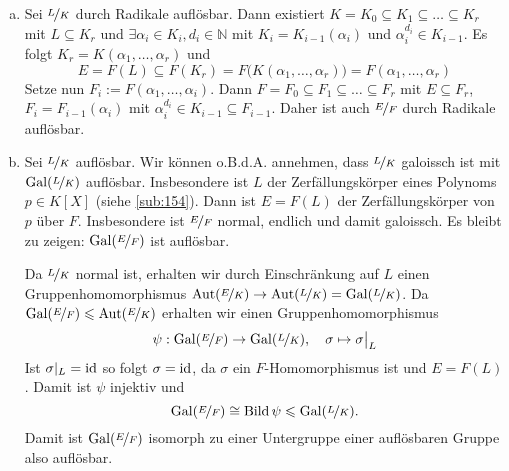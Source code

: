 \begin{enumerate}[a)]
	\item Sei $\nicefrac{L}{K}$ durch Radikale auflösbar. Dann existiert $K= K_0 \subseteq K_1 \subseteq \ldots \subseteq K_r$ mit 
	$L \subseteq K_r$ und $\exists \alpha_i \in K_i, d_i \in \mathds{N}$ mit $K_i= K_{i-1}(\alpha_i)$ und $\alpha_i^{d_i} \in K_{i-1}$.
	Es folgt $K_r = K(\alpha_1, \ldots , \alpha_r)$ und
	\[
		E=F(L) \subseteq F(K_r) = F\big(K(\alpha_1, \ldots , \alpha_r)\big) = F(\alpha_1, \ldots , \alpha_r)
	\]
	Setze nun $F_i := F(\alpha_1, \ldots , \alpha_i)$. Dann $F=F_0 \subseteq F_1 \subseteq \ldots \subseteq F_r$ mit $E \subseteq F_r$, $F_i = F_{i-1}(\alpha_i)$ mit
	$\alpha_i^{d_i} \in K_{i-1} \subseteq F_{i-1}$. Daher ist auch $\nicefrac{E}{F}$ durch Radikale auflösbar.
	\item Sei $\nicefrac{L}{K}$ auflösbar. Wir können o.B.d.A. annehmen, dass $\nicefrac{L}{K}$ galoissch ist mit $\operatorname{Gal}(\nicefrac{L}{K})$ auflösbar. Insbesondere ist 
	$L$ der Zerfällungskörper eines Polynoms $p \in K[X]$ (siehe \ref{sub:154}). Dann ist $E=F(L)$ der Zerfällungskörper von $p$ über $F$. Insbesondere ist 
	$\nicefrac{E}{F}$ normal, endlich und damit galoissch. Es bleibt zu zeigen: $\operatorname{Gal}(\nicefrac{E}{F})$ ist auflösbar.
	
	Da $\nicefrac{L}{K}$ normal ist, erhalten wir durch Einschränkung auf $L$ einen Gruppenhomomorphismus 
	$\operatorname{Aut} (\nicefrac{E}{K}) \to\operatorname{Aut}(\nicefrac{L}{K}) = \operatorname{Gal}(\nicefrac{L}{K})$. Da $\operatorname{Gal}(\nicefrac{E}{F}) \leqslant \operatorname{Aut}(\nicefrac{E}{K})$ erhalten wir einen Gruppenhomomorphismus
	\[
		\psi : \operatorname{Gal}(\nicefrac{E}{F}) \to \operatorname{Gal}(\nicefrac{L}{K}), \quad \sigma \mapsto \sigma\big|_L
	\]
	Ist $\sigma|_L = \operatorname{id}$ so folgt $\sigma= \operatorname{id}$, da $\sigma$ ein $F$-Homomorphismus ist und $E=F(L)$. Damit ist $\psi$ injektiv und 
	\[
		\operatorname{Gal}(\nicefrac{E}{F}) \cong \operatorname{Bild} \psi \leqslant \operatorname{Gal}(\nicefrac{L}{K}).
	\]
	Damit ist $\operatorname{Gal}(\nicefrac{E}{F})$ isomorph zu einer Untergruppe einer auflösbaren Gruppe also auflösbar.\bewende
\end{enumerate}

